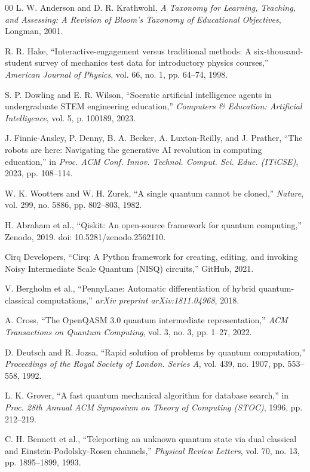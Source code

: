 \documentclass[conference]{IEEEtran}
\begin{document}
\begin{thebibliography}{00}
 L. W. Anderson and D. R. Krathwohl, \emph{A Taxonomy for Learning, Teaching, and Assessing: A Revision of Bloom's Taxonomy of Educational Objectives}, Longman, 2001.

 R. R. Hake, ``Interactive-engagement versus traditional methods: A six-thousand-student survey of mechanics test data for introductory physics courses,'' \emph{American Journal of Physics}, vol. 66, no. 1, pp. 64--74, 1998.

 S. P. Dowling and E. R. Wilson, ``Socratic artificial intelligence agents in undergraduate STEM engineering education,'' \emph{Computers \& Education: Artificial Intelligence}, vol. 5, p. 100189, 2023.

 J. Finnie-Ansley, P. Denny, B. A. Becker, A. Luxton-Reilly, and J. Prather, ``The robots are here: Navigating the generative AI revolution in computing education,'' in \emph{Proc. ACM Conf. Innov. Technol. Comput. Sci. Educ. (ITiCSE)}, 2023, pp. 108--114.

 W. K. Wootters and W. H. Zurek, ``A single quantum cannot be cloned,'' \emph{Nature}, vol. 299, no. 5886, pp. 802--803, 1982.

 H. Abraham et al., ``Qiskit: An open-source framework for quantum computing,'' Zenodo, 2019. doi: 10.5281/zenodo.2562110.

 Cirq Developers, ``Cirq: A Python framework for creating, editing, and invoking Noisy Intermediate Scale Quantum (NISQ) circuits,'' GitHub, 2021.

 V. Bergholm et al., ``PennyLane: Automatic differentiation of hybrid quantum-classical computations,'' \emph{arXiv preprint arXiv:1811.04968}, 2018.

 A. Cross, ``The OpenQASM 3.0 quantum intermediate representation,'' \emph{ACM Transactions on Quantum Computing}, vol. 3, no. 3, pp. 1--27, 2022.

 D. Deutsch and R. Jozsa, ``Rapid solution of problems by quantum computation,'' \emph{Proceedings of the Royal Society of London. Series A}, vol. 439, no. 1907, pp. 553--558, 1992.

 L. K. Grover, ``A fast quantum mechanical algorithm for database search,'' in \emph{Proc. 28th Annual ACM Symposium on Theory of Computing (STOC)}, 1996, pp. 212--219.

 C. H. Bennett et al., ``Teleporting an unknown quantum state via dual classical and Einstein-Podolsky-Rosen channels,'' \emph{Physical Review Letters}, vol. 70, no. 13, pp. 1895--1899, 1993.


\end{thebibliography}
\end{document}
